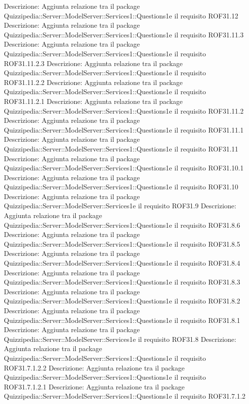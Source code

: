 Descrizione: Aggiunta relazione tra il package Quizzipedia::Server::ModelServer::Services1::Questions1e il requisito ROF31.12 
Descrizione: Aggiunta relazione tra il package Quizzipedia::Server::ModelServer::Services1::Questions1e il requisito ROF31.11.3 
Descrizione: Aggiunta relazione tra il package Quizzipedia::Server::ModelServer::Services1::Questions1e il requisito ROF31.11.2.3 
Descrizione: Aggiunta relazione tra il package Quizzipedia::Server::ModelServer::Services1::Questions1e il requisito ROF31.11.2.2 
Descrizione: Aggiunta relazione tra il package Quizzipedia::Server::ModelServer::Services1::Questions1e il requisito ROF31.11.2.1 
Descrizione: Aggiunta relazione tra il package Quizzipedia::Server::ModelServer::Services1::Questions1e il requisito ROF31.11.2 
Descrizione: Aggiunta relazione tra il package Quizzipedia::Server::ModelServer::Services1::Questions1e il requisito ROF31.11.1 
Descrizione: Aggiunta relazione tra il package Quizzipedia::Server::ModelServer::Services1::Questions1e il requisito ROF31.11 
Descrizione: Aggiunta relazione tra il package Quizzipedia::Server::ModelServer::Services1::Questions1e il requisito ROF31.10.1 
Descrizione: Aggiunta relazione tra il package Quizzipedia::Server::ModelServer::Services1::Questions1e il requisito ROF31.10 
Descrizione: Aggiunta relazione tra il package Quizzipedia::Server::ModelServer::Services1e il requisito ROF31.9 
Descrizione: Aggiunta relazione tra il package Quizzipedia::Server::ModelServer::Services1::Questions1e il requisito ROF31.8.6 
Descrizione: Aggiunta relazione tra il package Quizzipedia::Server::ModelServer::Services1::Questions1e il requisito ROF31.8.5 
Descrizione: Aggiunta relazione tra il package Quizzipedia::Server::ModelServer::Services1::Questions1e il requisito ROF31.8.4 
Descrizione: Aggiunta relazione tra il package Quizzipedia::Server::ModelServer::Services1::Questions1e il requisito ROF31.8.3 
Descrizione: Aggiunta relazione tra il package Quizzipedia::Server::ModelServer::Services1::Questions1e il requisito ROF31.8.2 
Descrizione: Aggiunta relazione tra il package Quizzipedia::Server::ModelServer::Services1::Questions1e il requisito ROF31.8.1 
Descrizione: Aggiunta relazione tra il package Quizzipedia::Server::ModelServer::Services1e il requisito ROF31.8 
Descrizione: Aggiunta relazione tra il package Quizzipedia::Server::ModelServer::Services1::Questions1e il requisito ROF31.7.1.2.2 
Descrizione: Aggiunta relazione tra il package Quizzipedia::Server::ModelServer::Services1::Questions1e il requisito ROF31.7.1.2.1 
Descrizione: Aggiunta relazione tra il package Quizzipedia::Server::ModelServer::Services1::Questions1e il requisito ROF31.7.1.2 
